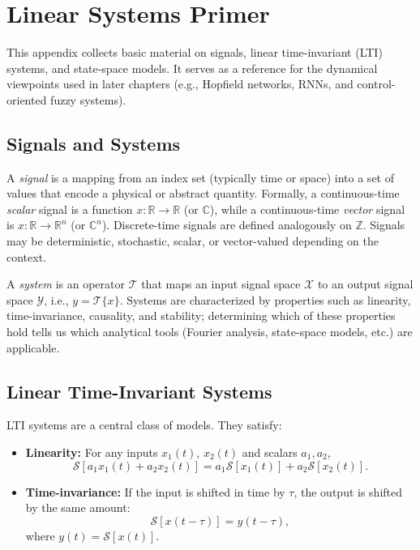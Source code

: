 \section{Linear Systems Primer}\label{app:linear_systems}

This appendix collects basic material on signals, linear time-invariant (LTI) systems, and state-space models. It serves as a reference for the dynamical viewpoints used in later chapters (e.g., Hopfield networks, RNNs, and control-oriented fuzzy systems).

\subsection*{Signals and Systems}

A \emph{signal} is a mapping from an index set (typically time or space) into a set of values that encode a physical or abstract quantity. Formally, a continuous-time \emph{scalar} signal is a function \(x: \mathbb{R} \to \mathbb{R}\) (or \(\mathbb{C}\)), while a continuous-time \emph{vector} signal is \(x: \mathbb{R} \to \mathbb{R}^n\) (or \(\mathbb{C}^n\)). Discrete-time signals are defined analogously on \(\mathbb{Z}\). Signals may be deterministic, stochastic, scalar, or vector-valued depending on the context.

A \emph{system} is an operator \( \mathcal{T} \) that maps an input signal space \( \mathcal{X} \) to an output signal space \( \mathcal{Y} \), i.e., \(y = \mathcal{T}\{x\}\). Systems are characterized by properties such as linearity, time-invariance, causality, and stability; determining which of these properties hold tells us which analytical tools (Fourier analysis, state-space models, etc.) are applicable.

\subsection*{Linear Time-Invariant Systems}

LTI systems are a central class of models. They satisfy:
\begin{itemize}
    \item \textbf{Linearity:} For any inputs \(x_1(t)\), \(x_2(t)\) and scalars \(a_1, a_2\),
    \[
    \mathcal{S}[a_1 x_1(t) + a_2 x_2(t)] = a_1 \mathcal{S}[x_1(t)] + a_2 \mathcal{S}[x_2(t)].
    \]
    \item \textbf{Time-invariance:} If the input is shifted in time by \(\tau\), the output is shifted by the same amount:
    \[
    \mathcal{S}[x(t - \tau)] = y(t - \tau),
    \]
    where \(y(t) = \mathcal{S}[x(t)]\).
\end{itemize}

